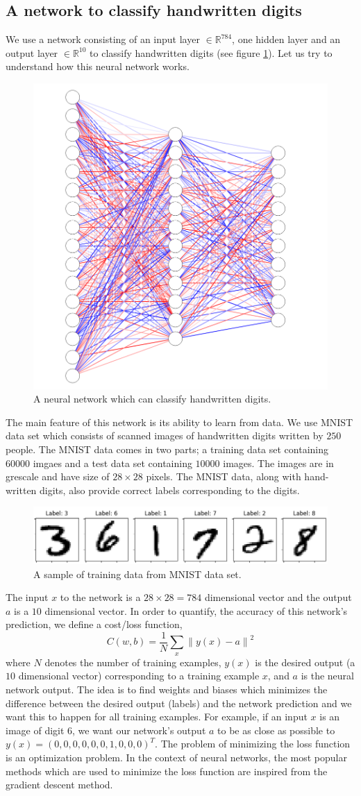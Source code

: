 \subsection{A network to classify handwritten digits}
We use a network consisting of an input layer $\in \mathbb{R}^{784}$, one hidden layer and an output layer $\in \mathbb{R}^{10}$ to classify handwritten
digits (see figure \ref{fig:NN_HD}). Let us try to understand how this neural network works. 
\begin{figure}[htbp]
    \centering
    \includegraphics[width=.4\textwidth]{Figures/NN_2.png}
    \caption{A neural network which can classify handwritten digits.}
    \label{fig:NN_HD}
\end{figure} 
The main feature of this network is its ability to learn from data. We use MNIST data set which consists of scanned images of handwritten digits written by $250$ people. The MNIST data
comes in two parts; a training data set containing $60000$ imgaes and a test data set containing $10000$ images. The images are in grescale and have size of $28 \times 28$ pixels.
The MNIST data, along with hand-written digits, also provide correct labels corresponding to the digits. 
\begin{figure}[htbp]
    \centering
    \includegraphics[width=.4\textwidth]{Figures/mnist_data_sample.png}
    \caption{A sample of training data from MNIST data set.}
    \label{fig:mnist_data}
\end{figure} 
The input $x$ to the network is a $28 \times 28 = 784$ dimensional vector and the output $a$ is a $10$ dimensional vector. In order to quantify, the 
accuracy of this network's prediction, we define a cost/loss function,
$$C(w,b) = \frac{1}{N} \sum_x {\|y(x) - a\|}^2$$
where $N$ denotes the number of training examples, $y(x)$ is the desired output (a $10$ dimensional vector) corresponding to a training example $x$, and 
$a$ is the neural network output. The idea is to find weights and biases which minimizes the difference between the desired output (labels) and the network prediction and we want this to happen for all training examples. For example, 
if an input $x$ is an image of digit $6$, we want our network's output $a$ to be as close as possible to $y(x) = (0,0,0,0,0,0,1,0,0,0)^T$. The problem of 
minimizing the loss function is an optimization problem. In the context of neural networks, the most popular methods which are used to minimize the loss function are 
inspired from the gradient descent method. 

